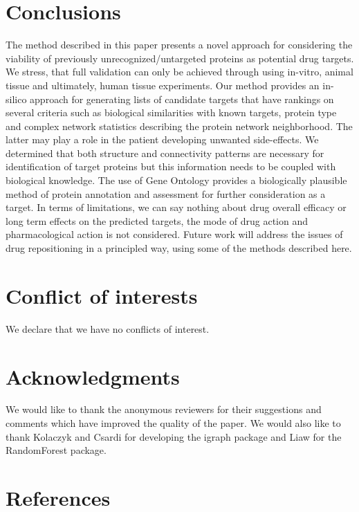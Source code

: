 \documentclass[a4paper,8pt,twocolumn,5p]{elsarticle}
\begin{document}
\section{Conclusions}
The method described in this paper presents a novel approach for considering the viability of previously unrecognized/untargeted proteins as potential drug targets. We stress, that full validation can only be achieved through using in-vitro, animal tissue and ultimately, human tissue experiments. Our method provides an in-silico approach for generating lists of candidate targets that have rankings on several criteria such as biological similarities with known targets, protein type and complex network statistics describing the protein network neighborhood. The latter may play a role in the patient developing unwanted side-effects. We determined that both structure and connectivity patterns are necessary for identification of target proteins but this information needs to be coupled with biological knowledge. The use of Gene Ontology provides a biologically plausible method of protein annotation and assessment for further consideration as a target. In terms of limitations, we can say nothing about drug overall efficacy or long term effects on the predicted targets, the mode of drug action and pharmacological action is not considered. Future work will address the issues of drug repositioning in a principled way, using some of the methods described here.


\section*{Conflict of interests}
We declare that we have no conflicts of interest.

\section*{Acknowledgments}
We would like to thank the anonymous reviewers for their suggestions and comments which have improved the quality of the paper. We would also like to thank Kolaczyk and Csardi for developing the igraph package and Liaw for the RandomForest package.
\section*{References}  %


\end{document}
